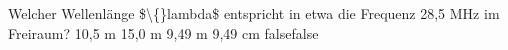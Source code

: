     {Welcher Wellenlänge \$\textbackslash\{\}lambda\$ entspricht in etwa die Frequenz 28,5 MHz im Freiraum? }
    {10,5 m}
    {15,0 m}
    {9,49 m}
    {9,49 cm}
    {false}{false}